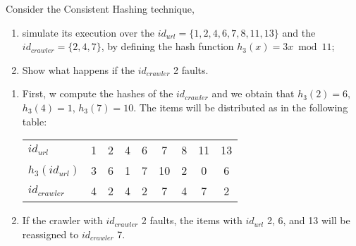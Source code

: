 \exercise

Consider the Consistent Hashing technique,

\begin{enumerate}

  \item simulate its execution over the $id_{url} = \{ 1, 2, 4, 6, 7, 8, 11,
  13 \}$ and the $id_{crawler} = \{ 2, 4, 7 \}$, by defining the hash function
  $h_3(x) = 3x \bmod 11$;

  \item Show what happens if the $id_{crawler}$ 2 faults.

\end{enumerate}

\solution

\begin{enumerate}

  \item First, w compute the hashes of the $id_{crawler}$ and we obtain that
  $h_3(2) = 6$, $h_3(4) = 1$, $h_3(7) = 10$. The items will be distributed as in
  the following table:
  \begin{table}[h]
    \centering
    \begin{tabular}{l|c|c|c|c|c|c|c|c}
      $id_{url}$      & 1 & 2 & 4 & 6 & 7 & 8 & 11 & 13 \\
      $h_3(id_{url})$ & 3 & 6 & 1 & 7 & 10 & 2 & 0 & 6 \\ \hline
      $id_{crawler}$  & 4 & 2 & 4 & 2 & 7 & 4 & 7 & 2 \\
    \end{tabular}
  \end{table}

  \item If the crawler with $id_{crawler}$ 2 faults, the items with $id_{url}$
  2, 6, and 13 will be reassigned to $id_{crawler}$ 7.

\end{enumerate}
